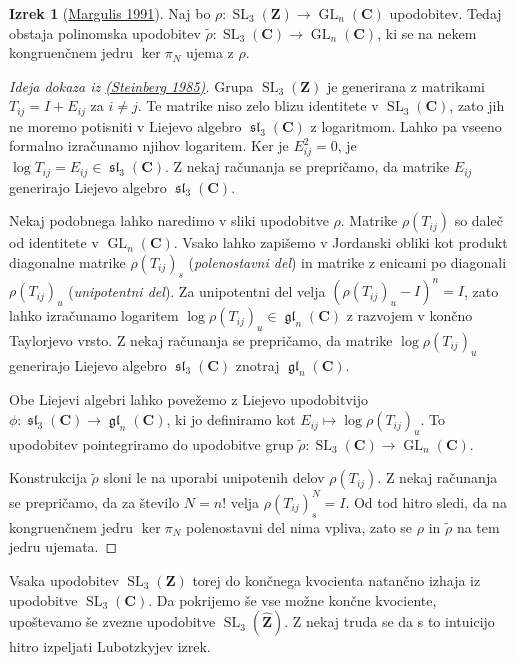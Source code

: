 \documentclass[11pt]{book}
\def\ZZ{\mathbf{Z}}
\def\CC{\mathbf{C}}
\DeclareMathOperator\GL{GL}
\DeclareMathOperator\glfrak{\mathfrak{gl}}
\DeclareMathOperator\slfrak{\mathfrak{sl}}
\DeclareMathOperator\SL{SL}
\theoremstyle{definition}
\theoremstyle{zgled}
\theoremstyle{odprtproblem}
\theoremstyle{domacanaloga}
\newenvironment{dokaz}
    {\color{siva}\begin{proof}}
    {\end{proof}}
\theoremstyle{izrek}
\newtheorem*{izrek}{Izrek}
\begin{document}
\begin{izrek}[\href{https://link.springer.com/book/9783642057212}{Margulis 1991}]
Naj bo $\rho \colon \SL_3(\ZZ) \to \GL_n(\CC)$ upodobitev. Tedaj obstaja polinomska upodobitev $\tilde \rho \colon \SL_3(\CC) \to \GL_n(\CC)$, ki se na nekem kongruenčnem jedru $\ker \pi_{N}$ ujema z $\rho$.
\end{izrek}
\begin{dokaz}[Ideja dokaza iz \href{https://zbmath.org/?q=an:0579.20038}{(Steinberg 1985)}]
Grupa $\SL_3(\ZZ)$ je generirana z matrikami $T_{ij} = I + E_{ij}$ za $i \neq j$. Te matrike niso zelo blizu identitete v $\SL_3(\CC)$, zato jih ne moremo potisniti v Liejevo algebro $\slfrak_3(\CC)$ z logaritmom. Lahko pa vseeno formalno izračunamo njihov logaritem. Ker je $E_{ij}^2 = 0$, je $\log T_{ij} = E_{ij} \in \slfrak_3(\CC)$. Z nekaj računanja se prepričamo, da matrike $E_{ij}$ generirajo  Liejevo algebro $\slfrak_3(\CC)$.

Nekaj podobnega lahko naredimo v sliki upodobitve $\rho$. Matrike $\rho(T_{ij})$ so daleč od identitete v $\GL_n(\CC)$. Vsako lahko zapišemo v Jordanski obliki kot produkt diagonalne matrike $\rho(T_{ij})_s$ (\emph{polenostavni del}) in matrike z enicami po diagonali $\rho(T_{ij})_u$ (\emph{unipotentni del}). Za unipotentni del velja $(\rho(T_{ij})_u - I)^n = I$, zato lahko izračunamo logaritem $\log \rho(T_{ij})_u \in \glfrak_n(\CC)$ z razvojem v končno Taylorjevo vrsto. Z nekaj računanja se prepričamo, da matrike $\log \rho(T_{ij})_u$ generirajo Liejevo algebro $\slfrak_3(\CC)$ znotraj $\glfrak_n(\CC)$. 

Obe Liejevi algebri lahko povežemo z Liejevo upodobitvijo $\phi \colon \slfrak_3(\CC) \to \glfrak_n(\CC)$, ki jo definiramo kot $E_{ij} \mapsto \log \rho(T_{ij})_u$. To upodobitev pointegriramo do upodobitve grup $\tilde \rho \colon \SL_3(\CC) \to \GL_n(\CC)$. 

Konstrukcija $\tilde \rho$ sloni le na uporabi unipotenih delov $\rho(T_{ij})$. Z nekaj računanja se prepričamo, da za število $N = n!$ velja $\rho(T_{ij})_s^N = I$. Od tod hitro sledi, da na kongruenčnem jedru $\ker \pi_N$ polenostavni del nima vpliva, zato se $\rho$ in $\tilde \rho$ na tem jedru ujemata.
\end{dokaz}

Vsaka upodobitev $\SL_3(\ZZ)$ torej do končnega kvocienta natančno izhaja iz upodobitve $\SL_3(\CC)$. Da pokrijemo še vse možne končne kvociente, upoštevamo še zvezne upodobitve $\SL_3(\widehat{\ZZ})$. Z nekaj truda se da s to intuicijo hitro izpeljati Lubotzkyjev izrek.
\end{document}
